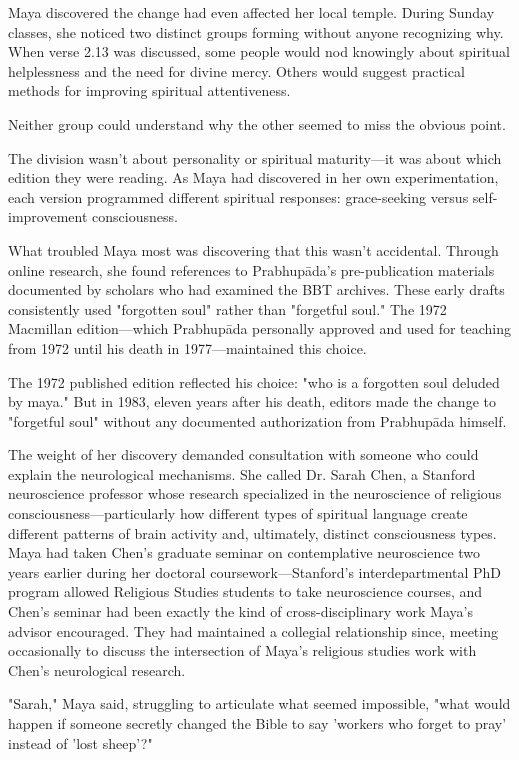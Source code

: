 \documentclass[12pt,twoside]{book}
\begin{document}
Maya discovered the change had even affected her local temple. During Sunday classes, she noticed two distinct groups forming without anyone recognizing why. When verse 2.13 was discussed, some people would nod knowingly about spiritual helplessness and the need for divine mercy. Others would suggest practical methods for improving spiritual attentiveness.

Neither group could understand why the other seemed to miss the obvious point.

The division wasn't about personality or spiritual maturity—it was about which edition they were reading. As Maya had discovered in her own experimentation, each version programmed different spiritual responses: grace-seeking versus self-improvement consciousness.

What troubled Maya most was discovering that this wasn't accidental. Through online research, she found references to Prabhupāda's pre-publication materials documented by scholars who had examined the BBT archives. These early drafts consistently used "forgotten soul" rather than "forgetful soul." The 1972 Macmillan edition—which Prabhupāda personally approved and used for teaching from 1972 until his death in 1977—maintained this choice.

The 1972 published edition reflected his choice: "who is a forgotten soul deluded by maya." But in 1983, eleven years after his death, editors made the change to "forgetful soul" without any documented authorization from Prabhupāda himself.

The weight of her discovery demanded consultation with someone who could explain the neurological mechanisms. She called Dr. Sarah Chen, a Stanford neuroscience professor whose research specialized in the neuroscience of religious consciousness—particularly how different types of spiritual language create different patterns of brain activity and, ultimately, distinct consciousness types. Maya had taken Chen's graduate seminar on contemplative neuroscience two years earlier during her doctoral coursework—Stanford's interdepartmental PhD program allowed Religious Studies students to take neuroscience courses, and Chen's seminar had been exactly the kind of cross-disciplinary work Maya's advisor encouraged. They had maintained a collegial relationship since, meeting occasionally to discuss the intersection of Maya's religious studies work with Chen's neurological research.

"Sarah," Maya said, struggling to articulate what seemed impossible, "what would happen if someone secretly changed the Bible to say 'workers who forget to pray' instead of 'lost sheep'?"
\end{document}
